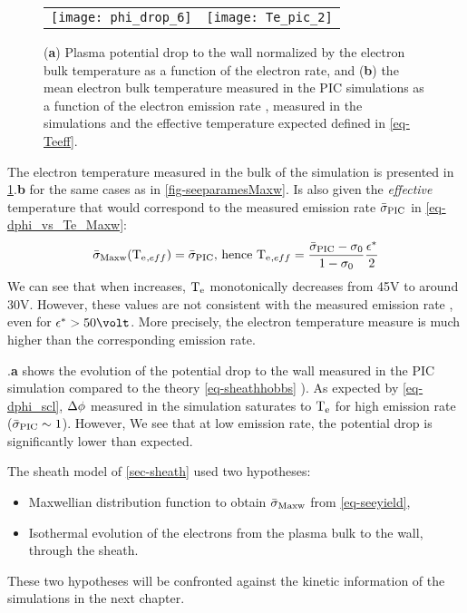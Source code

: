   \begin{figure}[hbt]
    \centering
    \begin{tabular}{cc}
      \texttt{[image: phi\_drop\_6]}
      &
      \texttt{[image: Te\_pic\_2]}
    \end{tabular}
    \caption{({\bf a}) Plasma potential drop to the wall normalized by the electron bulk temperature as a function of the electron rate, and ({\bf b}) the mean electron bulk temperature measured in the \acs{PIC} simulations as a function of the electron emission rate \rate, measured in the simulations and the effective temperature expected defined in \cref{eq-Teeff}.  }
    \label{fig-Tevsproba}
  \end{figure}
  
  The electron temperature measured in the bulk of the simulation is presented in \cref{fig-Tevsproba}.{\bf b} for the same cases as in \cref{fig-seeparamesMaxw}.
  Is also given the \emph{effective} temperature that would correspond to the measured emission rate $ \bar{\sigma }_{\rm PIC}$ in \cref{eq-dphi_vs_Te_Maxw}\string:
  \begin{equation} \label{eq-Teeff}
      \bar{\sigma }_{\rm Maxw}(\mathrm{T_e}{}_{, eff}) =  \bar{\sigma }_{\rm PIC} \text{, hence } \mathrm{T_e}{}_{, eff} = \frac{ \bar{\sigma }_{\rm PIC} - \sigma_0}{1 - \sigma_0} \frac{\epsilon^{*}}{2}
  \end{equation}
  We can see that when \rate increases, $\mathrm{T_e}$ monotonically decreases from 45V to around 30V.
  However, these values are not consistent with the measured emission rate \ratepic, even for $\crover > 50\volt$.
  More precisely, the electron temperature measure is much higher than the corresponding emission rate.

  .{\bf a} shows the evolution of the potential drop to the wall measured in the \ac{PIC} simulation compared to the theory  \cref{eq-sheathhobbs} ).
  As expected by \cref{eq-dphi_scl}, $\Delta \phi$ measured in the simulation saturates to $\mathrm{T_e}$ for high emission rate ($ \bar{\sigma }_{\rm PIC} \sim 1$).
  However, 
  We see that at low emission rate, the potential drop is significantly lower than expected.
  
  The sheath model of \cref{sec-sheath} used two hypotheses\string:
  \begin{itemize}
    \item Maxwellian distribution function to obtain $ \bar{\sigma }_{\rm Maxw}$ from \cref{eq-seeyield},
    \item Isothermal evolution of the electrons from the plasma bulk to the wall, through the sheath.
  \end{itemize}
  These two hypotheses will be confronted against the kinetic information of the simulations in the next chapter.
